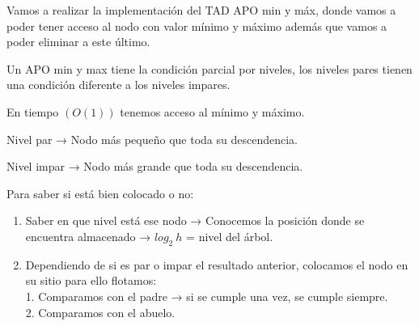 Vamos a realizar la implementación del TAD APO min y máx, donde vamos a poder tener acceso al nodo con valor mínimo y máximo además que vamos a poder eliminar a este último.

Un APO min y max tiene la condición parcial por niveles, los niveles pares tienen una condición diferente a los niveles impares.

En tiempo \((O(1))\) tenemos acceso al mínimo y máximo.

Nivel par → Nodo más pequeño que toda su descendencia.

Nivel impar → Nodo más grande que toda su descendencia.

Para saber si está bien colocado o no:
\begin{enumerate}
  \item Saber en que nivel está ese nodo → Conocemos la posición donde se encuentra almacenado → \(log_2\ h\)  = nivel del árbol.
  \item Dependiendo de si es par o impar el resultado anterior, colocamos el nodo en su sitio para ello flotamos:\\
    1. Comparamos con el padre → si se cumple una vez, se cumple siempre.\\
    2. Comparamos con el abuelo.

\end{enumerate}

